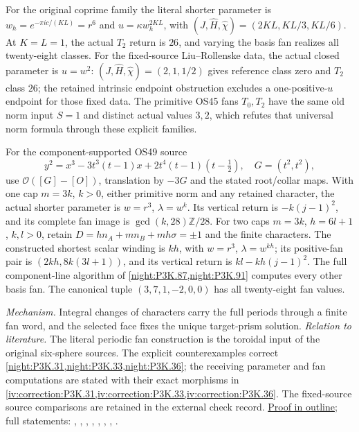 For the original coprime family the literal shorter parameter is
$w_h=e^{-\pi i c/(KL)}=r^6$ and
$u=\kappa w_h^{2KL}$, with
$(J,\widehat H,\widehat\chi)=(2KL,KL/3,KL/6)$.
At $K=L=1$, the actual $T_2$ return is $26$, and varying the basis
fan realizes all twenty-eight classes. For the fixed-source
Liu--Rollenske data, the actual closed parameter is $u=w^2$:
$(J,\widehat H,\widehat\chi)=(2,1,1/2)$ gives reference class zero
and $T_2$ class $26$; the retained intrinsic endpoint obstruction
excludes a one-positive-$u$ endpoint for those fixed data.
The primitive OS45 fans $T_0,T_2$ have the same old norm input
$S=1$ and distinct actual values $3,2$, which refutes that universal
norm formula through these explicit families.

For the component-supported OS49 source
\[
 y^2=x^3-3t^3(t-1)x+2t^4(t-1)(t-\tfrac12),\quad G=(t^2,t^2),
\]
use $\mathcal O([G]-[O])$, translation by $-3G$ and the stated
root/collar maps. With one cap $m=3k$, $k>0$, either primitive
norm and any retained character, the actual shorter parameter is
$w=r^3$, $\lambda=w^k$. Its vertical return is
$-k(j-1)^2$, and its complete fan image is
$\gcd(k,28)\mathbb Z/28$.
For two caps $m=3k$, $h=6l+1$, $k,l>0$, retain
$D=hn_A+mn_B+mh\sigma=\pm1$ and the finite characters.
The constructed shortest scalar winding is $kh$, with
$w=r^3$, $\lambda=w^{kh}$; its positive-fan pair is
$(2kh,8k(3l+1))$, and its vertical return is
$kl-kh(j-1)^2$. The full component-line algorithm of
\cref{night:P3K.87,night:P3K.91} computes every other basis fan.
The canonical tuple $(3,7,1,-2,0,0)$ has all twenty-eight fan values.

\textit{Mechanism.} Integral changes of characters carry the full periods through
a finite fan word, and the selected face fixes the unique target-prism solution.
\textit{Relation to literature.} The literal periodic fan construction is the toroidal input
of the original six-sphere sources. The explicit counterexamples
correct \cref{night:P3K.31,night:P3K.33,night:P3K.36}; the receiving
parameter and fan computations are stated with their exact morphisms
in \cref{iv:correction:P3K.31,iv:correction:P3K.33,iv:correction:P3K.36}.
The fixed-source source comparisons are retained in the external check record.
\hyperlink{outline-IV-C}{Proof in outline}; full statements: , , , , , , , .

\hypertarget{main-IV-D}{}
